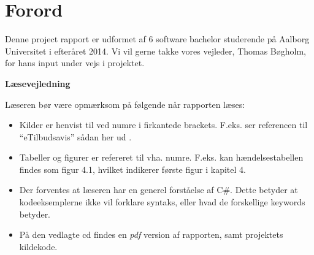 \chapter*{Forord}

Denne project rapport er udformet af 6 software bachelor studerende på Aalborg Universitet i efteråret 2014.
Vi vil gerne takke vores vejleder, Thomas Bøgholm, for hans input under vejs i projektet.

\textbf{Læsevejledning}

Læseren bør være opmærksom på følgende når rapporten læses:

\begin{itemize}
	\item Kilder er henvist til ved numre i firkantede brackets. 
	F.eks. ser referencen til ``eTilbudsavis'' sådan her ud \citep{eTilAPI}.
	\item Tabeller og figurer er refereret til vha. numre. F.eks. kan hændelsestabellen findes som figur 4.1, hvilket indikerer første figur i kapitel 4.
	\item Der forventes at læseren har en generel forståelse af C\#. Dette betyder at kodeeksemplerne ikke vil forklare syntaks, eller hvad de forskellige keywords betyder.
	\item På den vedlagte cd findes en \textit{pdf} version af rapporten, samt projektets kildekode. 
\end{itemize}